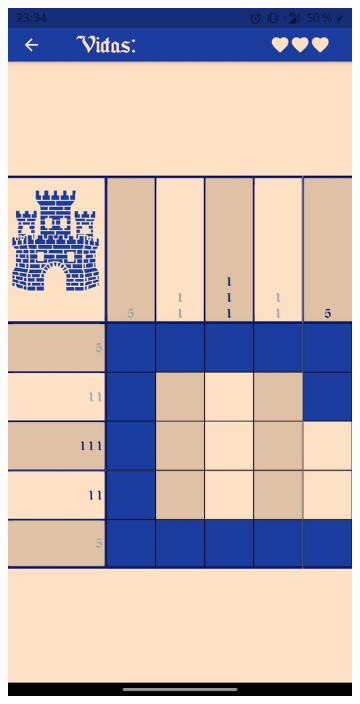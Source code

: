   \begin{figure}[H]
    \centering
    \begin{subfigure}[b]{0.22\linewidth}
      \includegraphics[width=\linewidth]{images/man12.jpeg}
    \end{subfigure}

\end{figure}

